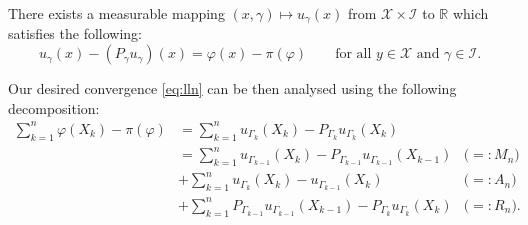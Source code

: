 \begin{assumption}
   \label{a:poisson}
There exists a measurable mapping $(x, \gamma) \mapsto u_{\gamma}(x)$ from $\mathcal{X} \times \mathcal{I}$ to $\mathbb{R}$ which satisfies the following:
\begin{equation}
    \label{eq:poisson}
   u_{\gamma}(x) - (P_{\gamma} u_{\gamma})(x) = \varphi(x) - \pi(\varphi) \qquad \text{for all $y \in \mathcal{X}$ and $\gamma \in \mathcal{I}$}.
\end{equation}
\end{assumption}

Our desired convergence \eqref{eq:lln} can be then analysed using the following decomposition:
\begin{align}
   \sum_{k=1}^n {\varphi(X_k) - \pi(\varphi)} 
   &= 
   \sum_{k=1}^n {u_{\Gamma_k}(X_k) - P_{\Gamma_k}u_{\Gamma_k}(X_k)} \label{eq:main-decomposition} \\
   &= 
   \sum_{k=1}^n {u_{\Gamma_{k-1}}(X_k) - P_{\Gamma_{k-1}}u_{\Gamma_{k-1}}(X_{k-1})} 
   & \big(=: M_n\big) 
   \nonumber\\
   & + 
   \sum_{k=1}^n {u_{\Gamma_k}(X_k) - u_{\Gamma_{k-1}}(X_k)} 
   & \big(=: A_n\big) 
   \nonumber\\
   & + 
   \sum_{k=1}^n {P_{\Gamma_{k-1}}u_{\Gamma_{k-1}}(X_{k-1}) - P_{\Gamma_k}u_{\Gamma_k}(X_k)} &\big(=: R_n\big).
   \nonumber
\end{align}







